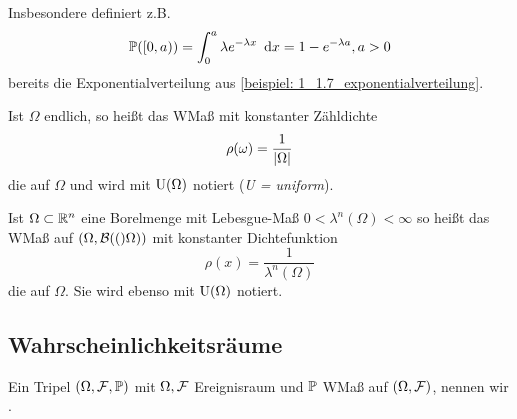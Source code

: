 Insbesondere definiert z.B.
\begin{equation*}
    \P([0,a)) = \int_{0}^{a} \lambda e^{-\lambda x} \dx = 1 - e^{-\lambda a}, a > 0
\end{equation*}
bereits die Exponentialverteilung aus \cref{beispiel: 1_1.7_exponentialverteilung}.


\begin{definition}[Gleichverteilung]
    Ist $\Omega$ endlich, so heißt das WMaß mit konstanter Zähldichte 
    \begin{equation*}
        \rho(\omega) = \frac{1}{\abs{\Omega}}
    \end{equation*} 
    die  auf $\Omega$ und wird mit $\Uni(\Omega)$ notiert (\textit{U = uniform}).
    
    Ist $\Omega \subset \Rn$ eine Borelmenge mit Lebesgue-Maß $0 < \lambda^n(\Omega) < \infty$ so heißt das WMaß auf $(\Omega, \borel(\Omega))$ mit konstanter Dichtefunktion 
    \begin{equation*}
        \rho(x) = \frac{1}{\lambda^n(\Omega)}
    \end{equation*} 
    die  auf $\Omega$. 
    Sie wird ebenso mit $\Uni(\Omega)$ notiert.
\end{definition}

\subsection*{Wahrscheinlichkeitsräume}

\begin{definition}[Wahrscheinlichkeitsraum]
    Ein Tripel $(\Omega, \ereignisF, \P)$ mit $\Omega, \ereignisF$ Ereignisraum und $\P$ WMaß auf $(\Omega, \ereignisF)$, nennen wir .
\end{definition}